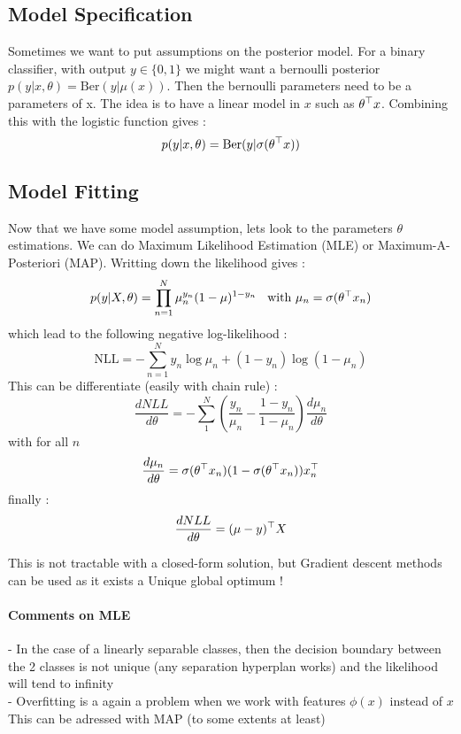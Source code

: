 		\subsection{Model Specification}

			Sometimes we want to put assumptions on the posterior model. For a binary classifier, with output $y\in \{0, 1\}$ we might want a bernoulli posterior $p(y | x, \theta) = \text{Ber}(y |\mu(x))$. Then the bernoulli parameters need to be a parameters of x. The idea is to have a linear model in $x$ such as $\theta ^\top x$. Combining this with the logistic function gives :
			\[
				p(y | x, \theta) = \text{Ber}(y | \sigma(\theta ^\top x))
			\]

		\subsection{Model Fitting}
			Now that we have some model assumption, lets look to the parameters $\theta$ estimations. We can do Maximum Likelihood Estimation (MLE) or Maximum-A-Posteriori (MAP). Writting down the likelihood gives :
			\[
				p(y | X, \theta) = \prod^N_{n=1} \mu^{y_n}_n(1-\mu)^{1-y_n} \; \; \text{ with } \mu_n = \sigma(\theta ^\top x_n)
			\]
			which lead to the following negative log-likelihood :
			\[
				\text{NLL} = -\sum^N_{n=1} y_n \log \mu_n +( 1-y_n) \log(1-\mu_n)
			\]
			This can be differentiate (easily with chain rule) :
			\[
				\frac{dNLL}{d\theta} = - \sum^N_1 (\frac{y_n}{\mu_n} - \frac{1-y_n}{1-\mu_n})\frac{d\mu_n}{d\theta} 
			\]
			with for all $n$
			\[
				\frac{d\mu_n}{d\theta}  = \sigma(\theta ^\top x_n)(1- \sigma(\theta ^\top x_n))x_n^\top
			\]
			finally : 
			\[
				\frac{dNLL}{d\theta} = (\mu - y )^\top X
			\]

			This is not tractable with a closed-form solution, but Gradient descent methods can be used as it exists a Unique global optimum !

			\paragraph*{Comments on MLE\\}
				- In the case of a linearly separable classes, then the decision boundary between the 2 classes is not unique (any separation hyperplan works) and the likelihood will tend to infinity\\
				- Overfitting is a again a problem when we work with features $\phi(x) $ instead of $x$\\
				This can be adressed with MAP (to some extents at least)

